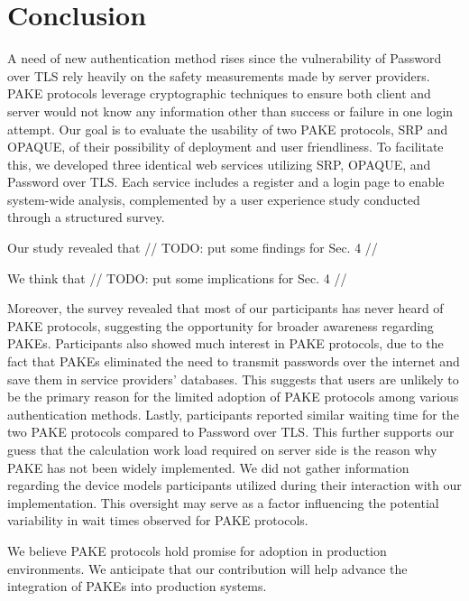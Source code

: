 \section{Conclusion}
\label{sec:conclusion}
A need of new authentication method rises since the vulnerability of Password over TLS rely heavily on the safety measurements made by server providers.
PAKE protocols leverage cryptographic techniques to ensure both client and server would not know any information other than success or failure in one login attempt.
Our goal is to evaluate the usability of two PAKE protocols, SRP and OPAQUE, of their possibility of deployment and user friendliness. 
To facilitate this, we developed three identical web services utilizing SRP, OPAQUE, and Password over TLS.
Each service includes a register and a login page to enable system-wide analysis, complemented by a user experience study conducted through a structured survey.

Our study revealed that // TODO: put some findings for Sec. 4 //

We think that // TODO: put some implications for Sec. 4 //

Moreover, the survey revealed that most of our participants has never heard of PAKE protocols, suggesting the opportunity for broader awareness regarding PAKEs.
Participants also showed much interest in PAKE protocols, due to the fact that PAKEs eliminated the need to transmit passwords over the internet and save them in service providers' databases.
This suggests that users are unlikely to be the primary reason for the limited adoption of PAKE protocols among various authentication methods.
Lastly, participants reported similar waiting time for the two PAKE protocols compared to Password over TLS.
This further supports our guess that the calculation work load required on server side is the reason why PAKE has not been widely implemented. 
We did not gather information regarding the device models participants utilized during their interaction with our implementation.
This oversight may serve as a factor influencing the potential variability in wait times observed for PAKE protocols.

We believe PAKE protocols hold promise for adoption in production environments. 
We anticipate that our contribution will help advance the integration of PAKEs into production systems.




